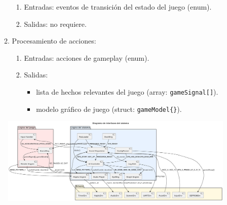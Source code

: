 \documentclass[11pt,a4paper]{article}
\begin{document}
\begin{enumerate}
\begin{enumerate}
      \begin{enumerate}
        \item Entradas: eventos de transición del estado del juego (enum).
        \item Salidas: no requiere.
      \end{enumerate}
      \item Procesamiento de acciones:
      \begin{enumerate}
        \item Entradas: acciones de gameplay (enum).
        \item Salidas:
        \begin{itemize}
          \item lista de hechos relevantes del juego (array: \texttt{gameSignal[]}).
          \item modelo gráfico de juego (struct: \texttt{gameModel\{\}}).
        \end{itemize}
      \end{enumerate}
    \end{enumerate}
  \end{enumerate}

\begin{figure}
  \centering
  \includegraphics[width=.95\textheight]{../Figuras/diagrama_interfaces.pdf}
  \label{fig:diagInterfaz}
\end{figure}




\end{document}
